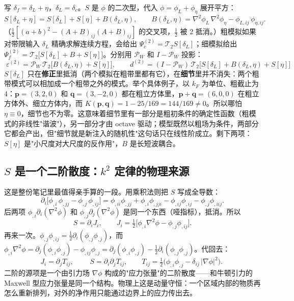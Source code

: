 \documentclass[11pt,UTF8,fontset=none]{ctexart}
\newcommand{\PW}{\mathcal P_W}
\begin{document}
写 $\delta_f=\delta_L+\eta$，$\delta_L=\delta_c$。$S$ 是 $\phi$ 的二次型，代入 $\phi=\phi_L+\phi_\eta$ 展开平方：
\begin{equation}
S[\delta_L+\eta]=S[\delta_L]+S[\eta]+B(\delta_L,\eta),\qquad
B(\delta_L,\eta)=\nabla^2\phi_L\,\nabla^2\phi_\eta-\phi_{L,ij}\,\phi_{\eta,ij}.
\label{eq:split}
\end{equation}
（$\tfrac12[(a+b)^2-(A+B)_{ij}(A+B)_{ij}]$ 的交叉项，$\tfrac12$ 被 2 抵消。）粗模拟如果对带限输入 $\delta_L$ 精确求解连续方程，会给出 $\Psi^{(2)}_c=\mathcal T_2S[\delta_L]$；细模拟给出 $\Psi^{(2)}_f=\mathcal T_2\big[S[\delta_L]+B+S[\eta]\big]$。分别用 $\PW$ 和 $I-\PW$ 投影：
\begin{equation}
\boxed{\;\varepsilon^{(2)}=\PW\,\mathcal T_2\Big[B(\delta_L,\eta)+S[\eta]\Big],\qquad
d^{(2)}=(I-\PW)\,\mathcal T_2\Big[S[\delta_L]+B(\delta_L,\eta)+S[\eta]\Big]\;}
\label{eq:eps2}
\end{equation}
$S[\delta_L]$ 只在\textbf{修正}里抵消（两个模拟在粗带里都有它），在\textbf{细节}里并不消失：两个粗带模式可以相加成一个粗带之外的模式。举个具体例子，以 $k_F$ 为单位、粗截止为 4：$\mathbf p=(3,2,0)$ 和 $\mathbf q=(3,-2,0)$ 都在粗立方体里，$\mathbf p+\mathbf q=(6,0,0)$ 在粗立方体外、细立方体内，而 $K(\mathbf p,\mathbf q)=1-25/169=144/169\neq0$。所以哪怕 $\eta\equiv0$，细节也不为零。这意味着细节里有一部分是粗初条件的确定性函数（粗模式的非线性"谐波"），另一部分才由 octave 驱动；模型既然以粗场为条件，两部分它都会产出，但"细节就是新注入的随机性"这句话只在线性阶成立。剩下两项：$S[\eta]$ 是"小尺度对大尺度的反作用"，$B$ 是长短波耦合。

\subsection{$S$ 是一个二阶散度：$k^2$ 定律的物理来源}

这是整份笔记里最值得亲手算的一段。用乘积法则把 $S$ 写成全导数：
\begin{equation}
\partial_i\big[\phi_{,i}\,\phi_{,jj}-\phi_{,j}\,\phi_{,ij}\big]
=\phi_{,ii}\phi_{,jj}+\phi_{,i}\phi_{,jji}-\phi_{,ij}\phi_{,ij}-\phi_{,j}\phi_{,iij}.
\end{equation}
后两项 $\phi_{,i}\partial_i(\nabla^2\phi)$ 和 $\phi_{,j}\partial_j(\nabla^2\phi)$ 是同一个东西（哑指标），抵消。所以
\begin{equation}
S=\partial_iJ_i,\qquad J_i=\tfrac12\big[\phi_{,i}\nabla^2\phi-\phi_{,j}\phi_{,ij}\big].
\end{equation}
再来一次。$\phi_{,j}\phi_{,ij}=\tfrac12\partial_i(\phi_{,j}\phi_{,j})$，而 $\phi_{,i}\nabla^2\phi=\partial_j(\phi_{,i}\phi_{,j})-\phi_{,ij}\phi_{,j}=\partial_j(\phi_{,i}\phi_{,j})-\tfrac12\partial_i(\phi_{,j}\phi_{,j})$。代回去：
\begin{equation}
J_i=\partial_jT_{ij},\qquad
\boxed{\;S=\partial_i\partial_jT_{ij},\qquad T_{ij}=\tfrac12\Big(\phi_{,i}\phi_{,j}-\delta_{ij}\,|\nabla\phi|^2\Big).\;}
\label{eq:stress}
\end{equation}
二阶的源项是一个由引力场 $\nabla\phi$ 构成的"应力张量"的二阶散度——和牛顿引力的 Maxwell 型应力张量是同一个结构。物理上这是动量守恒：一个区域内部的物质再怎么重新排列，对外的净作用只能通过边界上的应力传出去。
\end{document}
